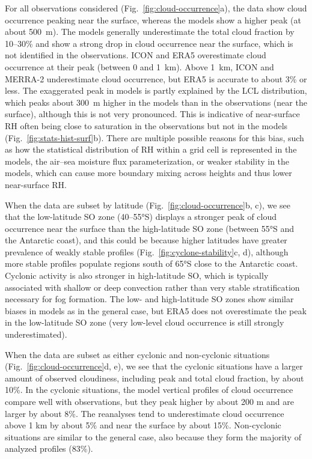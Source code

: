 \documentclass[draft]{agujournal2019}
\begin{document}
For all observations considered (Fig.~\ref{fig:cloud-occurrence}a), the data show cloud occurrence peaking near the surface, whereas the models show a higher peak (at about 500~m). The models generally underestimate the total cloud fraction by 10--30\% and show a strong drop in cloud occurrence near the surface, which is not identified in the observations. ICON and ERA5 overestimate cloud occurrence at their peak (between 0 and 1~km). Above 1~km, ICON and MERRA-2 underestimate cloud occurrence, but ERA5 is accurate to about 3\% or less. The exaggerated peak in models is partly explained by the LCL distribution, which peaks about 300~m higher in the models than in the observations (near the surface), although this is not very pronounced. This is indicative of near-surface RH often being close to saturation in the observations but not in the models (Fig.~\ref{fig:stats-hist-surf}b). There are multiple possible reasons for this bias, such as how the statistical distribution of RH within a grid cell is represented in the models, the air--sea moisture flux parameterization, or weaker stability in the models, which can cause more boundary mixing across heights and thus lower near-surface RH.

When the data are subset by latitude (Fig.~\ref{fig:cloud-occurrence}b, c), we see that the low-latitude SO zone (40--55°S) displays a stronger peak of cloud occurrence near the surface than the high-latitude SO zone (between 55°S and the Antarctic coast), and this could be because higher latitudes have greater prevalence of weakly stable profiles (Fig.~\ref{fig:cyclone-stability}c, d), although more stable profiles populate regions south of 65°S close to the Antarctic coast. Cyclonic activity is also stronger in high-latitude SO, which is typically associated with shallow or deep convection rather than very stable stratification necessary for fog formation. The low- and high-latitude SO zones show similar biases in models as in the general case, but ERA5 does not overestimate the peak in the low-latitude SO zone (very low-level cloud occurrence is still strongly underestimated).

When the data are subset as either cyclonic and non-cyclonic situations (Fig.~\ref{fig:cloud-occurrence}d, e), we see that the cyclonic situations have a larger amount of observed cloudiness, including peak and total cloud fraction, by about 10\%. In the cyclonic situations, the model vertical profiles of cloud occurrence compare well with observations, but they peak higher by about 200 m and are larger by about 8\%. The reanalyses tend to underestimate cloud occurrence above 1 km by about 5\% and near the surface by about 15\%. Non-cyclonic situations are similar to the general case, also because they form the majority of analyzed profiles (83\%).
\end{document}
